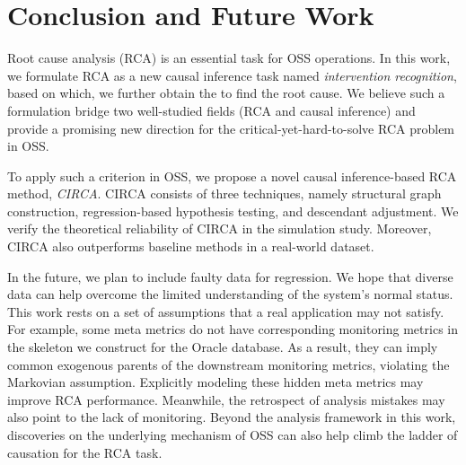 \section{Conclusion and Future Work}\label{sec:conclusion}

Root cause analysis (RCA) is an essential task for OSS operations.
In this work, we formulate RCA as a new causal inference task named \textit{intervention recognition}, based on which, we further obtain the  to find the root cause.
We believe such a formulation bridge two well-studied fields (RCA and causal inference) and provide a promising new direction for the critical-yet-hard-to-solve RCA problem in OSS.

To apply such a criterion in OSS, we propose a novel causal inference-based RCA method, \textit{CIRCA}.
CIRCA consists of three techniques, namely structural graph construction, regression-based hypothesis testing, and descendant adjustment.
We verify the theoretical reliability of CIRCA in the simulation study.
Moreover, CIRCA also outperforms baseline methods in a real-world dataset.

In the future, we plan to include faulty data for regression.
We hope that diverse data can help overcome the limited understanding of the system's normal status.
This work rests on a set of assumptions that a real application may not satisfy.
For example, some meta metrics do not have corresponding monitoring metrics in the skeleton we construct for the Oracle database.
As a result, they can imply common exogenous parents of the downstream monitoring metrics, violating the Markovian assumption.
Explicitly modeling these hidden meta metrics may improve RCA performance.
Meanwhile, the retrospect of analysis mistakes may also point to the lack of monitoring.
Beyond the analysis framework in this work, discoveries on the underlying mechanism of OSS can also help climb the ladder of causation for the RCA task.
